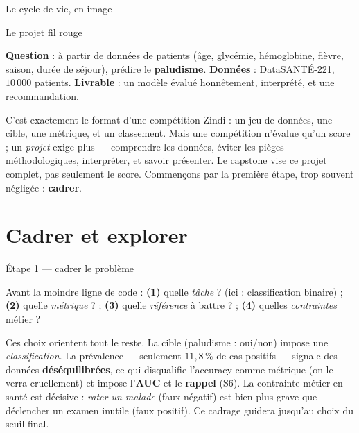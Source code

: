 \documentclass[aspectratio=169,11pt]{beamer}
\begin{document}
\begin{frame}{Le cycle de vie, en image}
\end{frame}

\begin{frame}{Le projet fil rouge}
\begin{ucaddef}
{\small \textbf{Question} : à partir de données de patients (âge, glycémie, hémoglobine, fièvre, saison, durée de séjour), prédire le \textbf{paludisme}. \textbf{Données} : DataSANTÉ-221, $10\,000$ patients. \textbf{Livrable} : un modèle évalué honnêtement, interprété, et une recommandation.}
\end{ucaddef}
{\small C'est exactement le format d'une compétition Zindi : un jeu de données, une cible, une métrique, et un classement. Mais une compétition n'évalue qu'un score ; un \emph{projet} exige plus — comprendre les données, éviter les pièges méthodologiques, interpréter, et savoir présenter. Le capstone vise ce projet complet, pas seulement le score. Commençons par la première étape, trop souvent négligée : \textbf{cadrer}.}
\end{frame}

\section{Cadrer et explorer}

\begin{frame}{Étape 1 — cadrer le problème}
\begin{ucaddef}
{\small Avant la moindre ligne de code : \textbf{(1)} quelle \emph{tâche} ? (ici : classification binaire) ; \textbf{(2)} quelle \emph{métrique} ? ; \textbf{(3)} quelle \emph{référence} à battre ? ; \textbf{(4)} quelles \emph{contraintes} métier ?}
\end{ucaddef}
{\small Ces choix orientent tout le reste. La cible (paludisme : oui/non) impose une \emph{classification}. La prévalence — seulement $11{,}8\,\%$ de cas positifs — signale des données \textbf{déséquilibrées}, ce qui disqualifie l'accuracy comme métrique (on le verra cruellement) et impose l'\textbf{AUC} et le \textbf{rappel} (S6). La contrainte métier en santé est décisive : \emph{rater un malade} (faux négatif) est bien plus grave que déclencher un examen inutile (faux positif). Ce cadrage guidera jusqu'au choix du seuil final.}
\end{frame}
\end{document}
